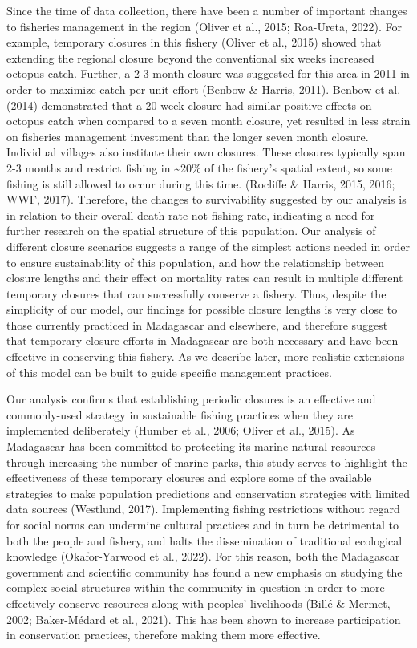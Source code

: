 \documentclass[
]{article}
\begin{document}
Since the time of data collection, there have been a number of important changes to fisheries management in the region (Oliver et al., 2015; Roa-Ureta, 2022). For example, temporary closures in this fishery (Oliver et al., 2015) showed that extending the regional closure beyond the conventional six weeks increased octopus catch. Further, a 2-3 month closure was suggested for this area in 2011 in order to maximize catch-per unit effort (Benbow \& Harris, 2011). Benbow et al. (2014) demonstrated that a 20-week closure had similar positive effects on octopus catch when compared to a seven month closure, yet resulted in less strain on fisheries management investment than the longer seven month closure. Individual villages also institute their own closures. These closures typically span 2-3 months and restrict fishing in \textasciitilde20\% of the fishery's spatial extent, so some fishing is still allowed to occur during this time. (Rocliffe \& Harris, 2015, 2016; WWF, 2017). Therefore, the changes to survivability suggested by our analysis is in relation to their overall death rate not fishing rate, indicating a need for further research on the spatial structure of this population. Our analysis of different closure scenarios suggests a range of the simplest actions needed in order to ensure sustainability of this population, and how the relationship between closure lengths and their effect on mortality rates can result in multiple different temporary closures that can successfully conserve a fishery. Thus, despite the simplicity of our model, our findings for possible closure lengths is very close to those currently practiced in Madagascar and elsewhere, and therefore suggest that temporary closure efforts in Madagascar are both necessary and have been effective in conserving this fishery. As we describe later, more realistic extensions of this model can be built to guide specific management practices.

Our analysis confirms that establishing periodic closures is an effective and commonly-used strategy in sustainable fishing practices when they are implemented deliberately (Humber et al., 2006; Oliver et al., 2015). As Madagascar has been committed to protecting its marine natural resources through increasing the number of marine parks, this study serves to highlight the effectiveness of these temporary closures and explore some of the available strategies to make population predictions and conservation strategies with limited data sources (Westlund, 2017). Implementing fishing restrictions without regard for social norms can undermine cultural practices and in turn be detrimental to both the people and fishery, and halts the dissemination of traditional ecological knowledge (Okafor-Yarwood et al., 2022). For this reason, both the Madagascar government and scientific community has found a new emphasis on studying the complex social structures within the community in question in order to more effectively conserve resources along with peoples' livelihoods (Billé \& Mermet, 2002; Baker-Médard et al., 2021). This has been shown to increase participation in conservation practices, therefore making them more effective.
\end{document}
